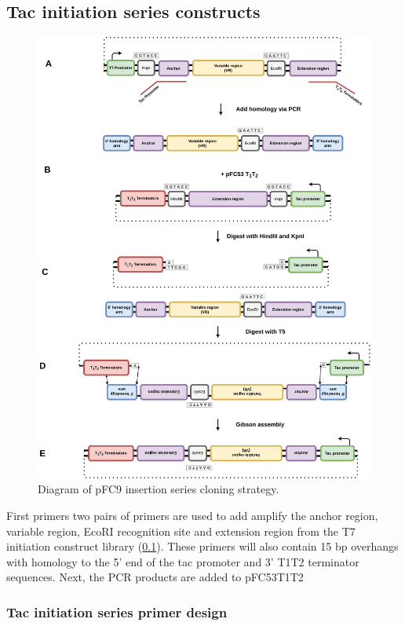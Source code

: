 \documentclass[11pt]{article}
\begin{document}
\subsection{Tac initiation series constructs}
\label{sec:tac-init}


\begin{figure}[H]
	\includegraphics[width=15cm]{images/cloning_diagrams/construct_diagrams-Tac-initiation-series.png}
	\centering
	\caption{Diagram of pFC9 insertion series cloning strategy.}
\end{figure}

First primers two pairs of primers are used to add amplify the anchor region, variable region, EcoRI recognition site and extension region from the T7 initiation construct library (\ref{sec:tac-init}). These primers will also contain 15 bp overhangs with homology to the 5' end of the tac promoter and 3' T1T2 terminator sequences. Next, the PCR products are added to pFC53T1T2 

\subsubsection{Tac initiation series primer design}
\end{document}
